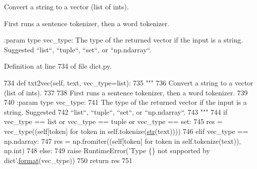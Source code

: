 \begin{DoxyVerb}Convert a string to a vector (list of ints).

First runs a sentence tokenizer, then a word tokenizer.

:param type vec_type:
    The type of the returned vector if the input is a string. Suggested
    ``list``, ``tuple``, ``set``, or ``np.ndarray``.
\end{DoxyVerb}
 

Definition at line 734 of file dict.\+py.


\begin{DoxyCode}
734     \textcolor{keyword}{def }txt2vec(self, text, vec\_type=list):
735         \textcolor{stringliteral}{"""}
736 \textcolor{stringliteral}{        Convert a string to a vector (list of ints).}
737 \textcolor{stringliteral}{}
738 \textcolor{stringliteral}{        First runs a sentence tokenizer, then a word tokenizer.}
739 \textcolor{stringliteral}{}
740 \textcolor{stringliteral}{        :param type vec\_type:}
741 \textcolor{stringliteral}{            The type of the returned vector if the input is a string. Suggested}
742 \textcolor{stringliteral}{            ``list``, ``tuple``, ``set``, or ``np.ndarray``.}
743 \textcolor{stringliteral}{        """}
744         \textcolor{keywordflow}{if} vec\_type == list \textcolor{keywordflow}{or} vec\_type == tuple \textcolor{keywordflow}{or} vec\_type == set:
745             res = vec\_type((self[token] \textcolor{keywordflow}{for} token \textcolor{keywordflow}{in} self.tokenize(\hyperlink{namespacegenerate__task__READMEs_a5b88452ffb87b78c8c85ececebafc09f}{str}(text))))
746         \textcolor{keywordflow}{elif} vec\_type == np.ndarray:
747             res = np.fromiter((self[token] \textcolor{keywordflow}{for} token \textcolor{keywordflow}{in} self.tokenize(text)), np.int)
748         \textcolor{keywordflow}{else}:
749             \textcolor{keywordflow}{raise} RuntimeError(\textcolor{stringliteral}{'Type \{\} not supported by dict'}.\hyperlink{namespaceparlai_1_1chat__service_1_1services_1_1messenger_1_1shared__utils_a32e2e2022b824fbaf80c747160b52a76}{format}(vec\_type))
750         \textcolor{keywordflow}{return} res
751 
\end{DoxyCode}
\mbox{\label{classparlai_1_1core_1_1dict_1_1DictionaryAgent_af2eeb50b2cd6cf3a8ca817b729ec7486}} 
